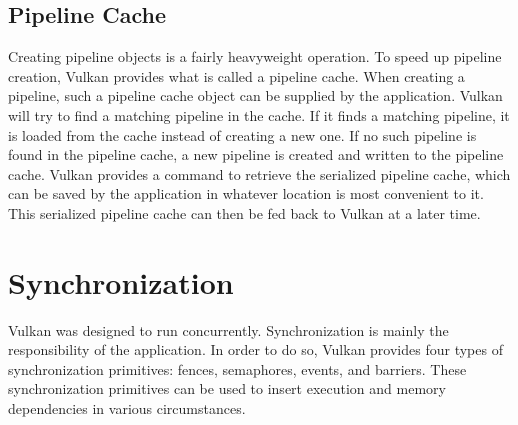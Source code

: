     \subsection{Pipeline Cache}
    \label{subsec:PipelineCache}



      Creating pipeline objects is a fairly heavyweight operation.
      To speed up pipeline creation, Vulkan provides what is called a pipeline cache.
      When creating a pipeline, such a pipeline cache object can be supplied by the \gls{application}.
      Vulkan will try to find a matching pipeline in the cache.
      If it finds a matching pipeline, it is loaded from the cache instead of creating a new one.
      If no such pipeline is found in the pipeline cache, a new pipeline is created and written to the pipeline cache.
      Vulkan provides a command to retrieve the serialized pipeline cache, which can be saved by the \gls{application} in whatever location is most convenient to it.
      This serialized pipeline cache can then be fed back to Vulkan at a later time.

  \section{Synchronization}
    Vulkan was designed to run concurrently. Synchronization is mainly the responsibility of the \gls{application}. In order to do so, Vulkan provides four types of synchronization primitives: fences, semaphores, events, and barriers. These synchronization primitives can be used to insert execution and memory dependencies in various circumstances.

